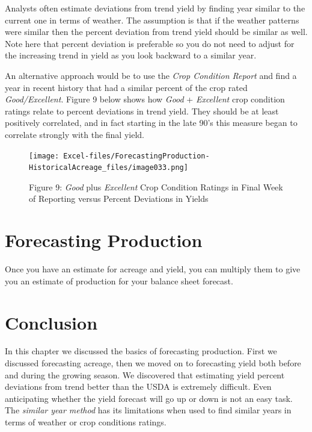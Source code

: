 \documentclass[
]{book}
\begin{document}
Analysts often estimate deviations from trend yield by finding year similar to the current one in terms of weather. The assumption is that if the weather patterns were similar then the percent deviation from trend yield should be similar as well. Note here that percent deviation is preferable so you do not need to adjust for the increasing trend in yield as you look backward to a similar year.

An alternative approach would be to use the \emph{Crop Condition Report} and find a year in recent history that had a similar percent of the crop rated \emph{Good/Excellent}. Figure 9 below shows how \emph{Good} + \emph{Excellent} crop condition ratings relate to percent deviations in trend yield. They should be at least positively correlated, and in fact starting in the late 90's this measure began to correlate strongly with the final yield.

\begin{figure}
\centering
\texttt{[image: Excel-files/ForecastingProduction-HistoricalAcreage\_files/image033.png]}
\caption{Figure 9: \emph{Good} plus \emph{Excellent} Crop Condition Ratings in Final Week of Reporting versus Percent Deviations in Yields}
\end{figure}

\hypertarget{forecasting-production-1}{%
\section{Forecasting Production}\label{forecasting-production-1}}

Once you have an estimate for acreage and yield, you can multiply them to give you an estimate of production for your balance sheet forecast.

\hypertarget{conclusion-1}{%
\section{Conclusion}\label{conclusion-1}}

In this chapter we discussed the basics of forecasting production. First we discussed forecasting acreage, then we moved on to forecasting yield both before and during the growing season. We discovered that estimating yield percent deviations from trend better than the USDA is extremely difficult. Even anticipating whether the yield forecast will go up or down is not an easy task. The \emph{similar year method} has its limitations when used to find similar years in terms of weather or crop conditions ratings.
\end{document}

